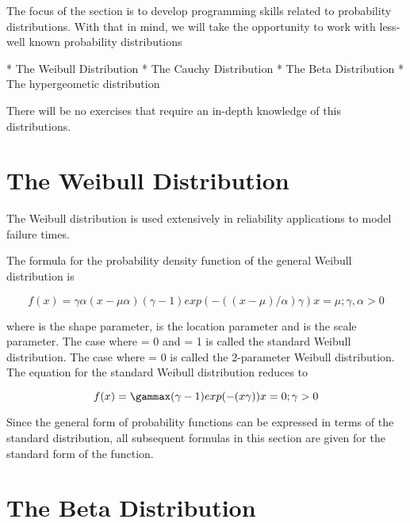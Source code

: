 


The focus of the section is to develop programming skills
related to probability distributions. With that in mind, we will take the opportunity
to work with less-well known probability distributions


* The Weibull Distribution
* The Cauchy Distribution
* The Beta Distribution
* The hypergeometic distribution


There will be no exercises that require an in-depth knowledge of this distributions.


\section{The Weibull Distribution}
The Weibull distribution is used extensively in reliability applications to model failure times.



The formula for the probability density function of the general Weibull distribution is

\[ f(x)=\gamma\alpha(x-\mu\alpha)(\gamma-1)exp(-((x-\mu)/\alpha)\gamma)x=\mu;\gamma,\alpha>0\]

where \gamma is the shape parameter, \mu is the location parameter and \alpha is the scale parameter. The case where \mu = 0 and \alpha = 1 is called the standard Weibull distribution. The case where \mu = 0 is called the 2-parameter Weibull distribution. The equation for the standard Weibull distribution reduces to

\[ f(x)=\gammax(\gamma-1)exp(-(x\gamma))x=0;\gamma>0 \]

Since the general form of probability functions can be expressed in terms of the standard distribution, all subsequent formulas in this section are given for the standard form of the function.


\section{The Beta Distribution}


